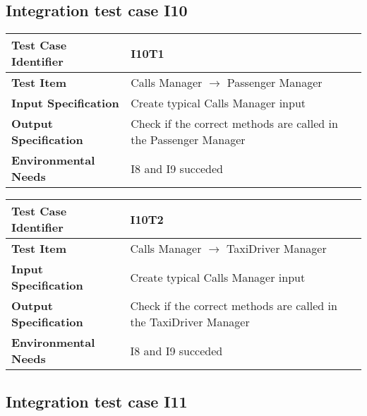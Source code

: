 \subsection{Integration test case I10}

\begin{table}[!htbp]
\begin{center}
\begin{tabular}[t]{p{}p{}}

\hline
\textbf{Test Case Identifier} & I10T1 \\
\hline
\textbf{Test Item} & Calls Manager $\rightarrow$ Passenger Manager \\
\hline
\textbf{Input Specification} & Create typical Calls Manager input \\
\hline
\textbf{Output Specification} & Check if the correct methods are called in the Passenger Manager \\
\hline
\textbf{Environmental Needs} & I8 and I9 succeded \\
\hline

\end{tabular}
\end{center}
\end{table}

\begin{table}[!htbp]
\begin{center}
\begin{tabular}[t]{p{}p{}}

\hline
\textbf{Test Case Identifier} & I10T2 \\
\hline
\textbf{Test Item} & Calls Manager $\rightarrow$ TaxiDriver Manager \\
\hline
\textbf{Input Specification} & Create typical Calls Manager input \\
\hline
\textbf{Output Specification} & Check if the correct methods are called in the TaxiDriver Manager \\
\hline
\textbf{Environmental Needs} & I8 and I9 succeded \\
\hline

\end{tabular}
\end{center}
\end{table}

\subsection{Integration test case I11}

